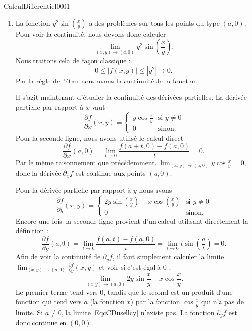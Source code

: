 \begin{corrige}{CalculDifferentiel0001}
\begin{enumerate}
		\item
			La fonction $y^2\sin\left( \frac{ x }{ y } \right)$ a des problèmes sur tous les points du type $(a,0)$. Pour voir la continuité, nous devons donc calculer
			\begin{equation}
				\lim_{(x,y)\to(a,0)}y^2\sin\left( \frac{ x }{ y } \right).
			\end{equation}
			Nous traitons cela de façon classique :
			\begin{equation}
				0\leq| f(x,y) |\leq | y^2 |\to 0.
			\end{equation}
			Par la règle de l'étau nous avons la continuité de la fonction.

			Il s'agit maintenant d'étudier la continuité des dérivées partielles. La dérivée partielle par rapport à $x$ vaut
			\begin{equation}
				\frac{ \partial f }{ \partial x }(x,y)=\begin{cases}
					y\cos\frac{ x }{ y }	&	\text{si }y\neq 0\\
					0	&	 \text{sinon.}
				\end{cases}
			\end{equation}
			Pour la seconde ligne, nous avons utilisé le calcul direct
			\begin{equation}
				\frac{ \partial f }{ \partial x }(a,0)=\lim_{t\to 0} \frac{ f(a+t,0)-f(a,0) }{ t }=0.
			\end{equation}
			Par le même raisonnement que précédemment, $\lim_{(x,y)\to(a,0)}y\cos\frac{ x }{ y }=0$, donc la dérivée $\partial_xf$ est continue aux points $(a,0)$.

			Pour la dérivée partielle par rapport à $y$ nous avons
			\begin{equation}
				\frac{ \partial f }{ \partial y }(x,y)=\begin{cases}
					2y\sin\left( \frac{ x }{ y } \right)-x\cos\left( \frac{ x }{ y } \right)	&	\text{si }y\neq 0\\
					0	&	 \text{sinon.}
				\end{cases}
			\end{equation}
			Encore une fois, la seconde ligne provient d'un calcul utilisant directement la définition :
			\begin{equation}
				\frac{ \partial f }{ \partial y }(a,0)=\lim_{t\to 0} \frac{ f(a,t)-f(a,0) }{ t }=\lim_{t\to 0} t\sin\left( \frac{ a }{ t } \right)=0.
			\end{equation}
			Afin de voir la continuité de $\partial_yf$, il faut simplement calculer la limite $\lim_{(x,y)\to(a,0)}\frac{ \partial f }{ \partial y }(x,y)$ et voir si c'est égal à $0$ :
			\begin{equation}		\label{EqcCDusellcy}
				\lim_{(x,y)\to(a,0)}2y\sin\frac{ x }{ y }-x\cos\frac{ x }{ y }.
			\end{equation}
			Le premier terme tend vers $0$, tandis que le second est un produit d'une fonction qui tend vers $a$ (la fonction $x$) par la fonction $\cos\frac{ x }{ y }$ qui n'a pas de limite. Si $a\neq 0$, la limite \eqref{EqcCDusellcy} n'existe pas. La fonction $\partial_yf$ est donc continue en $(0,0)$.


\end{enumerate}
\end{corrige}
